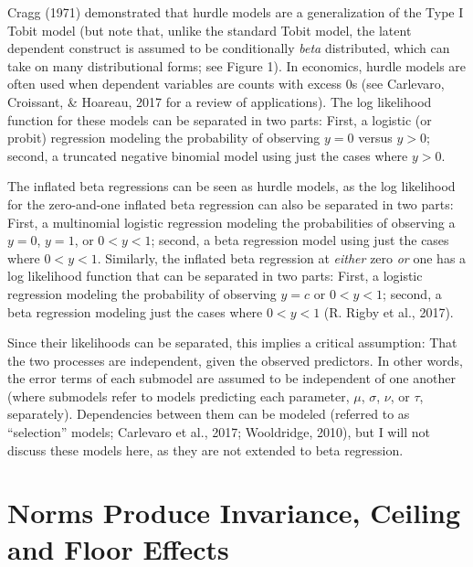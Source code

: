 \documentclass[english,man]{apa6}
\theoremstyle{definition}
\theoremstyle{definition}
\theoremstyle{remark}
\begin{document}
Cragg (1971) demonstrated that hurdle models are a generalization of the
Type I Tobit model (but note that, unlike the standard Tobit model, the
latent dependent construct is assumed to be conditionally \emph{beta}
distributed, which can take on many distributional forms; see Figure 1).
In economics, hurdle models are often used when dependent variables are
counts with excess 0s (see Carlevaro, Croissant, \& Hoareau, 2017 for a
review of applications). The log likelihood function for these models
can be separated in two parts: First, a logistic (or probit) regression
modeling the probability of observing \(y = 0\) versus \(y > 0\);
second, a truncated negative binomial model using just the cases where
\(y > 0\).

The inflated beta regressions can be seen as hurdle models, as the log
likelihood for the zero-and-one inflated beta regression can also be
separated in two parts: First, a multinomial logistic regression
modeling the probabilities of observing a \(y = 0\), \(y = 1\), or
\(0 < y < 1\); second, a beta regression model using just the cases
where \(0 < y < 1\). Similarly, the inflated beta regression at
\emph{either} zero \emph{or} one has a log likelihood function that can
be separated in two parts: First, a logistic regression modeling the
probability of observing \(y = c\) or \(0 < y < 1\); second, a beta
regression modeling just the cases where \(0 < y < 1\) (R. Rigby et al.,
2017).

Since their likelihoods can be separated, this implies a critical
assumption: That the two processes are independent, given the observed
predictors. In other words, the error terms of each submodel are assumed
to be independent of one another (where submodels refer to models
predicting each parameter, \(\mu\), \(\sigma\), \(\nu\), or \(\tau\),
separately). Dependencies between them can be modeled (referred to as
``selection'' models; Carlevaro et al., 2017; Wooldridge, 2010), but I
will not discuss these models here, as they are not extended to beta
regression.

\section{Norms Produce Invariance, Ceiling and Floor
Effects}\label{norms-produce-invariance-ceiling-and-floor-effects}
\end{document}
